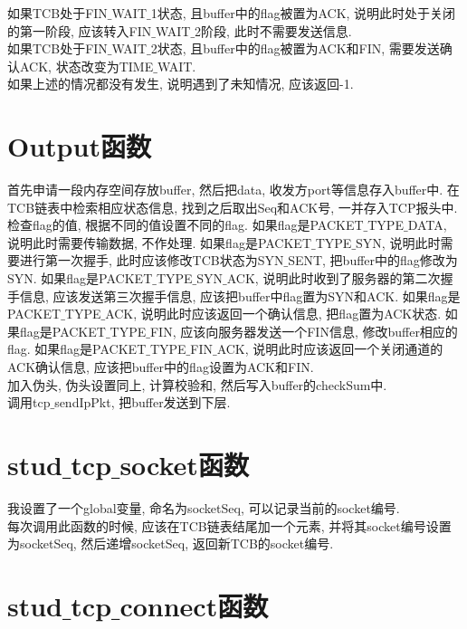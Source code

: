 \documentclass[a4paper,12pt,notitlepage]{article}
\begin{document}
	如果TCB处于FIN$\_$WAIT$\_$1状态, 且buffer中的flag被置为ACK, 说明此时处于关闭的第一阶段, 应该转入FIN$\_$WAIT$\_$2阶段, 此时不需要发送信息. \\
	
	如果TCB处于FIN$\_$WAIT$\_$2状态, 且buffer中的flag被置为ACK和FIN, 需要发送确认ACK, 状态改变为TIME$\_$WAIT. \\
	
	如果上述的情况都没有发生, 说明遇到了未知情况, 应该返回-1.

\section{Output函数}

	首先申请一段内存空间存放buffer, 然后把data, 收发方port等信息存入buffer中. 在TCB链表中检索相应状态信息, 找到之后取出Seq和ACK号, 一并存入TCP报头中. \\

	检查flag的值, 根据不同的值设置不同的flag. 如果flag是PACKET$\_$TYPE$\_$DATA, 说明此时需要传输数据, 不作处理. 如果flag是PACKET$\_$TYPE$\_$SYN, 说明此时需要进行第一次握手, 此时应该修改TCB状态为SYN$\_$SENT, 把buffer中的flag修改为SYN. 如果flag是PACKET$\_$TYPE$\_$SYN$\_$ACK, 说明此时收到了服务器的第二次握手信息, 应该发送第三次握手信息, 应该把buffer中flag置为SYN和ACK. 如果flag是PACKET$\_$TYPE$\_$ACK, 说明此时应该返回一个确认信息, 把flag置为ACK状态. 如果flag是PACKET$\_$TYPE$\_$FIN, 应该向服务器发送一个FIN信息, 修改buffer相应的flag. 如果flag是PACKET$\_$TYPE$\_$FIN$\_$ACK, 说明此时应该返回一个关闭通道的ACK确认信息, 应该把buffer中的flag设置为ACK和FIN. \\
	
	加入伪头, 伪头设置同上, 计算校验和, 然后写入buffer的checkSum中. \\
	
	调用tcp$\_$sendIpPkt, 把buffer发送到下层.

\section{stud$\_$tcp$\_$socket函数}

	我设置了一个global变量, 命名为socketSeq, 可以记录当前的socket编号. \\
	
	每次调用此函数的时候, 应该在TCB链表结尾加一个元素, 并将其socket编号设置为socketSeq, 然后递增socketSeq, 返回新TCB的socket编号.
	
\section{stud$\_$tcp$\_$connect函数}
\end{document}
